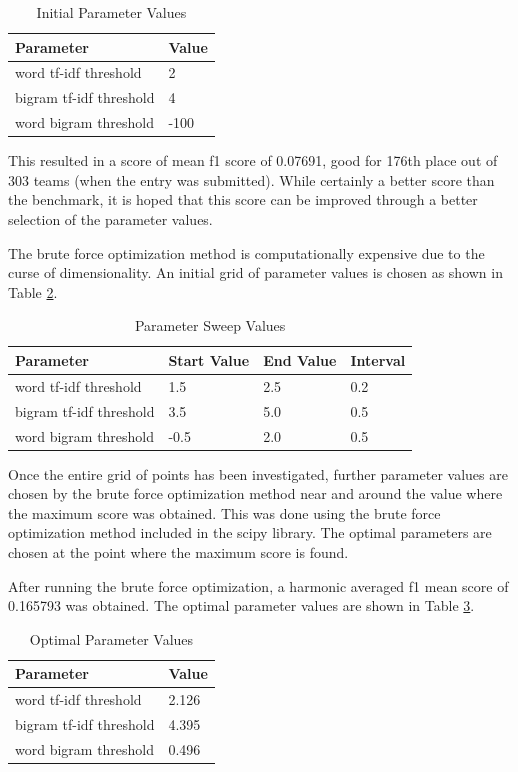 \documentclass{article}
\begin{document}
\begin{table}[!]
\centering
\caption{Initial Parameter Values}
\label{tab:initial_params}
\begin{tabular}{|l|l|}
\hline
Parameter & Value  \\ \hline
word tf-idf threshold & 2 \\ \hline
bigram tf-idf threshold & 4 \\ \hline
word bigram threshold & -100 \\ \hline
\end{tabular}
\end{table}

This resulted in a score of mean f1 score of 0.07691, good for 176th place out
of 303 teams (when the entry was submitted). While certainly a better
score than the benchmark, it is hoped that this score can be improved through
a better selection of the parameter values. 

The brute force optimization method is computationally expensive due to the
curse of dimensionality. An initial grid of parameter values is chosen as
shown in Table \ref{tab:params_sweep_values}.

\begin{table}[!]
\centering
\caption{Parameter Sweep Values}
\label{tab:params_sweep_values}
\begin{tabular}{|l|l|l|l|}
\hline
Parameter & Start Value & End Value & Interval  \\ \hline
word tf-idf threshold & 1.5 & 2.5 & 0.2 \\ \hline
bigram tf-idf threshold & 3.5 & 5.0 & 0.5 \\ \hline
word bigram threshold & -0.5 & 2.0 & 0.5 \\ \hline
\end{tabular}
\end{table}

Once the entire grid of points has been investigated, further parameter values
are chosen by the brute force optimization method near and around the value
where the maximum score was obtained. This was done using the brute force
optimization method included in the scipy library. The optimal parameters are
chosen at the point where the maximum score is found.

After running the brute force optimization, a harmonic averaged f1 mean score
of 0.165793 was obtained. The optimal parameter values are shown in Table \ref{tab:optimal_params}.

\begin{table}[!]
\centering
\caption{Optimal Parameter Values}
\label{tab:optimal_params}
\begin{tabular}{|l|l|}
\hline
Parameter & Value  \\ \hline
word tf-idf threshold & 2.126 \\ \hline
bigram tf-idf threshold & 4.395 \\ \hline
word bigram threshold & 0.496 \\ \hline
\end{tabular}
\end{table}
\end{document}
